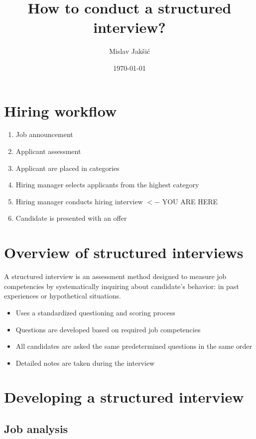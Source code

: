 \documentclass{article}
\title{How to conduct a structured interview?}
\author{Mislav Jakšić}
\date{\today}
\begin{document}
\maketitle



\section{Hiring workflow}

\begin{enumerate}
  \item Job announcement
  \item Applicant assessment
  \item Applicant are placed in categories
  \item Hiring manager selects applicants from the highest category
  \item Hiring manager conducts hiring interview $<-$ YOU ARE HERE
  \item Candidate is presented with an offer
\end{enumerate}



\section{Overview of structured interviews}

A structured interview is an assessment method designed to measure job competencies by systematically inquiring about candidate’s behavior: in past experiences or hypothetical situations.

\begin{itemize}
  \item Uses a standardized questioning and scoring process
  \item Questions are developed based on required job competencies
  \item All candidates are asked the same predetermined questions in the same order
  \item Detailed notes are taken during the interview
\end{itemize}



\section{Developing a structured interview}


\subsection{Job analysis}
\end{document}

